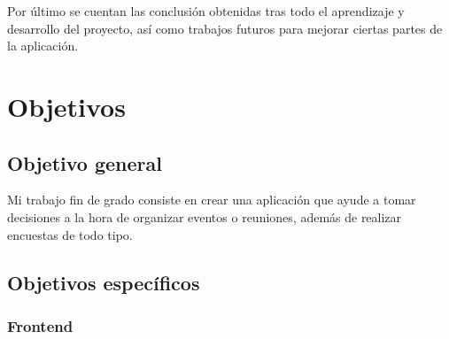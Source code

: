 \documentclass[a4paper, 12pt]{book}
\begin{document}
Por \'ultimo se cuentan las conclusi\'on obtenidas tras todo el aprendizaje y desarrollo del proyecto, as\'i como trabajos futuros para mejorar ciertas partes
de la aplicaci\'on.




\cleardoublepage %
\chapter{Objetivos} %
\label{chap:objetivos} %

\section{Objetivo general} %
\label{sec:objetivo-general} %

Mi trabajo fin de grado consiste en crear una aplicaci\'on que ayude a tomar decisiones a la
hora de organizar eventos o reuniones, adem\'as de realizar encuestas de todo tipo.


\section{Objetivos espec\'ificos}
\label{sec:objetivos-especificos}


\subsection{Frontend}
\label{sec:objetivos-especificos}
\end{document}
